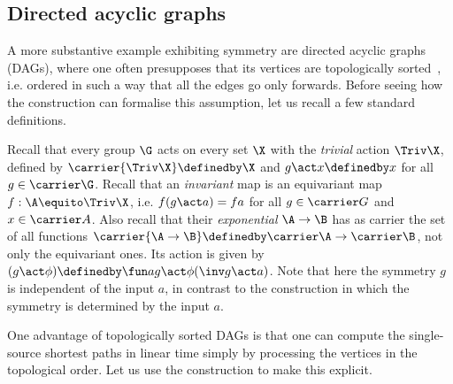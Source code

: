 \subsection{Directed acyclic graphs}

A more substantive example exhibiting symmetry are directed
acyclic graphs (DAGs), where one often presupposes that its vertices
are topologically sorted~\cite[Sec.~20.4]{cormen}, i.e. ordered in
such a way that all the edges go only forwards. Before seeing how the
\WLOG construction can formalise this assumption, let us recall a few
standard definitions.

Recall that every group $\G$ acts on every set $\X$ with the
\emph{trivial} action $\Triv \X$, defined by
  \(
    \carrier{\Triv \X} \definedby \X
  \) and \(
    g \act x \definedby x
  \)
  for all $g \in \carrier\G$.
  Recall that an \emph{invariant} map is an equivariant map $f : \A \equito \Triv
  \X$, i.e. $f (g \act a) = f a$ for all $g \in \carrier G$ and $x \in
  \carrier A$.
  Also recall that their \emph{exponential} $\A \to \B$ has as carrier
  the set of all functions
  \(
    \carrier{\A \to \B}\definedby \carrier\A \to \carrier\B
  \), not only the equivariant ones. Its action is given by
  \(
    (g \act \phi) \definedby \fun a g \act  \phi(\inv g\act a)
  \). Note that here the symmetry $g$ is independent of the input $a$,
  in contrast to the \WLOG{} construction in which the symmetry is
  determined by the input $a$.


One advantage of topologically sorted DAGs is that one can compute the
single-source shortest paths in linear time simply by processing the
vertices in the topological order. Let us use the \WLOG construction
to make this explicit.

